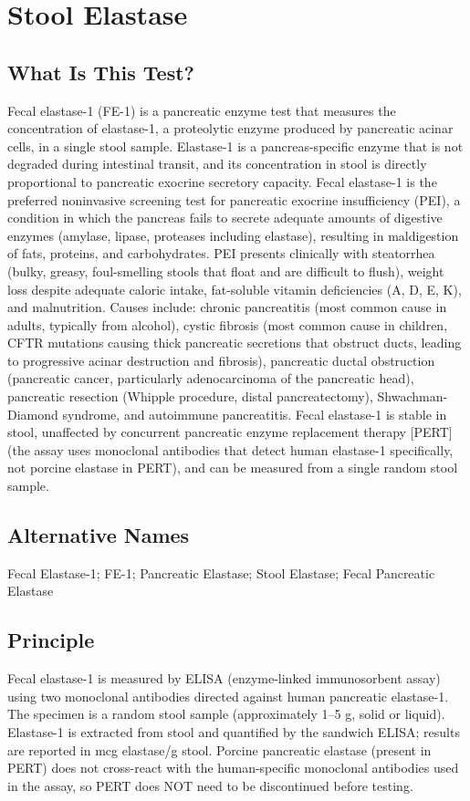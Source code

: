 \chapter{Stool Elastase}
\section*{What Is This Test?}
Fecal elastase-1 (FE-1) is a pancreatic enzyme test that measures the concentration of elastase-1, a proteolytic enzyme produced by pancreatic acinar cells, in a single stool sample. Elastase-1 is a pancreas-specific enzyme that is not degraded during intestinal transit, and its concentration in stool is directly proportional to pancreatic exocrine secretory capacity. Fecal elastase-1 is the preferred noninvasive screening test for pancreatic exocrine insufficiency (PEI), a condition in which the pancreas fails to secrete adequate amounts of digestive enzymes (amylase, lipase, proteases including elastase), resulting in maldigestion of fats, proteins, and carbohydrates. PEI presents clinically with steatorrhea (bulky, greasy, foul-smelling stools that float and are difficult to flush), weight loss despite adequate caloric intake, fat-soluble vitamin deficiencies (A, D, E, K), and malnutrition. Causes include: chronic pancreatitis (most common cause in adults, typically from alcohol), cystic fibrosis (most common cause in children, CFTR mutations causing thick pancreatic secretions that obstruct ducts, leading to progressive acinar destruction and fibrosis), pancreatic ductal obstruction (pancreatic cancer, particularly adenocarcinoma of the pancreatic head), pancreatic resection (Whipple procedure, distal pancreatectomy), Shwachman-Diamond syndrome, and autoimmune pancreatitis. Fecal elastase-1 is stable in stool, unaffected by concurrent pancreatic enzyme replacement therapy [PERT] (the assay uses monoclonal antibodies that detect human elastase-1 specifically, not porcine elastase in PERT), and can be measured from a single random stool sample.
\section*{Alternative Names}
Fecal Elastase-1; FE-1; Pancreatic Elastase; Stool Elastase; Fecal Pancreatic Elastase
\section*{Principle}
Fecal elastase-1 is measured by ELISA (enzyme-linked immunosorbent assay) using two monoclonal antibodies directed against human pancreatic elastase-1. The specimen is a random stool sample (approximately 1--5 g, solid or liquid). Elastase-1 is extracted from stool and quantified by the sandwich ELISA; results are reported in mcg elastase/g stool. Porcine pancreatic elastase (present in PERT) does not cross-react with the human-specific monoclonal antibodies used in the assay, so PERT does NOT need to be discontinued before testing.

